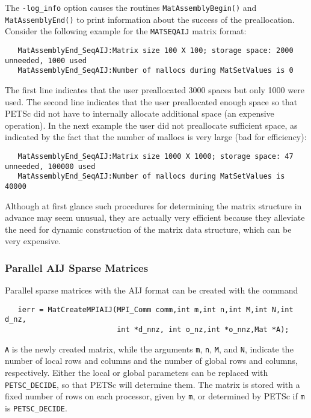 The {\tt -log\_info}  option causes the routines
{\tt MatAssemblyBegin()} and {\tt MatAssemblyEnd()} to print
information about the success of the preallocation.  Consider the
following example for the {\tt MATSEQAIJ} matrix format:
\begin{verbatim}
   MatAssemblyEnd_SeqAIJ:Matrix size 100 X 100; storage space: 2000 unneeded, 1000 used
   MatAssemblyEnd_SeqAIJ:Number of mallocs during MatSetValues is 0
\end{verbatim}
The first line indicates that the user preallocated 3000 spaces but only
1000 were used. The second line indicates that the user preallocated
enough space so that PETSc did not have to internally allocate additional
space (an expensive operation).  In the next example the user did not
preallocate sufficient space, as indicated by the fact that the number
of mallocs is very large (bad for efficiency):
\begin{verbatim}
   MatAssemblyEnd_SeqAIJ:Matrix size 1000 X 1000; storage space: 47 unneeded, 100000 used
   MatAssemblyEnd_SeqAIJ:Number of mallocs during MatSetValues is 40000
\end{verbatim}
 
Although at first glance such procedures for determining the matrix
structure in advance may seem unusual, they are actually very
efficient because they alleviate the need for dynamic
construction of the matrix data structure, which can be very
expensive.


\subsubsection{Parallel AIJ Sparse Matrices}

Parallel sparse matrices with the AIJ 
format can be created with the command 
\begin{verbatim}
   ierr = MatCreateMPIAIJ(MPI_Comm comm,int m,int n,int M,int N,int d_nz,
                          int *d_nnz, int o_nz,int *o_nnz,Mat *A);
\end{verbatim}
{\tt A} is the newly created matrix, while the arguments {\tt m}, {\tt n}, 
{\tt M}, and {\tt N}, indicate the number of local rows and columns and
the number of global rows and columns, respectively. Either the local or
global parameters can be replaced with {\tt PETSC\_DECIDE}, so that 
PETSc will determine  them.
The matrix is stored with a fixed number of rows on 
each processor, given by {\tt m}, or determined by PETSc if {\tt m} is
{\tt PETSC\_DECIDE}.

